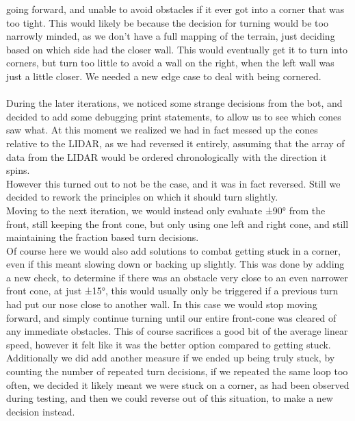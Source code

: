 \documentclass[conference]{IEEEtran}
\begin{document}
going forward, and unable to avoid obstacles if it ever got into a corner that was too tight. 
This would likely be because the decision for turning would be too narrowly minded, as we don't have a 
full mapping of the terrain, just deciding based on which side had the closer wall. 
This would eventually get it to turn into corners, but turn too little to avoid a wall on the right, 
when the left wall was just a little closer. We needed a new edge case to deal with being cornered.
\\\\
During the later iterations, we noticed some strange decisions from the bot, and decided to add some debugging print
statements, to allow us to see which cones saw what. At this moment we realized we had in fact messed up the cones 
relative to the LIDAR, as we had reversed it entirely, assuming that the array of data from the LIDAR would be ordered 
chronologically with the direction it spins. \\
However this turned out to not be the case, and it was in fact reversed. 
Still we decided to rework the principles on which it should turn slightly. \\
Moving to the next iteration, we would instead only evaluate ±90° from the front, 
still keeping the front cone, but only using one left and right cone, 
and still maintaining the fraction based turn decisions. \\
Of course here we would also add solutions to combat getting stuck in a corner, even if this meant slowing down or backing up slightly. 
This was done by adding a new check, to determine if there was an obstacle very close to an even narrower front cone, at just ±15°, 
this would usually only be triggered if a previous turn had put our nose close to another wall. 
In this case we would stop moving forward, and simply continue turning until our entire front-cone 
was cleared of any immediate obstacles. This of course sacrifices a good bit 
of the average linear speed, however it felt like it was the better option compared to getting stuck. 
Additionally we did add another measure if we ended up being truly stuck, by counting the number of repeated turn decisions, 
if we repeated the same loop too often, we decided it likely meant we were stuck on a corner, as had been observed during testing, 
and then we could reverse out of this situation, to make a new decision instead.
\\\\
\end{document}
